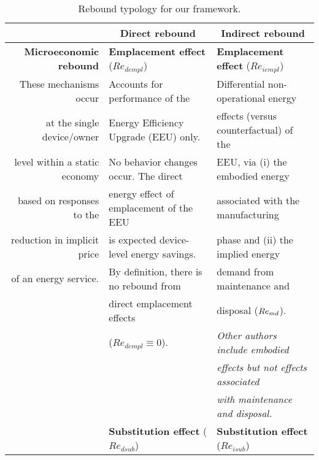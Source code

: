 


\begin{table}
\footnotesize
\begin{center}
\caption{Rebound typology for our framework.}
\label{tab:rebound_typology}
\begin{tabular}{ r l l }
\toprule
                                   & \multicolumn{1}{c}{\textbf{Direct rebound}}  & \multicolumn{1}{c}{\textbf{Indirect rebound}} \\
\midrule
\textbf{Microeconomic rebound}     & \textbf{Emplacement effect} ($Re_{dempl}$)   & \textbf{Emplacement effect} ($Re_{iempl}$) \\
These mechanisms occur             & Accounts for performance of the              & Differential non-operational energy  \\
at the single device/owner         & Energy Efficiency Upgrade (EEU) only.        & effects (versus counterfactual) of the  \\
level within a static economy      & No behavior changes occur. The direct        & EEU, via (i) the embodied energy  \\
based on responses to the          & energy effect of emplacement of the EEU      & associated with the manufacturing  \\
reduction in implicit price        & is expected device-level energy savings.     & phase and (ii) the implied energy \\
of an energy service.              & By definition, there is no rebound from      & demand from maintenance and  \\
                                   & direct emplacement effects                   & disposal ($Re_{md}$).  \\
                                   & ($Re_{dempl} \equiv 0$).                     & \emph{Other authors include embodied}  \\
                                   &                                              & \emph{effects but not effects associated} \\
                                   &                                              & \emph{with maintenance and disposal.} \\
                                   \cmidrule{2-3}
                                   & \textbf{Substitution effect} ($Re_{dsub}$)   & \textbf{Substitution effect} ($Re_{isub}$) \\

\end{tabular}
\end{center}
\end{table}
